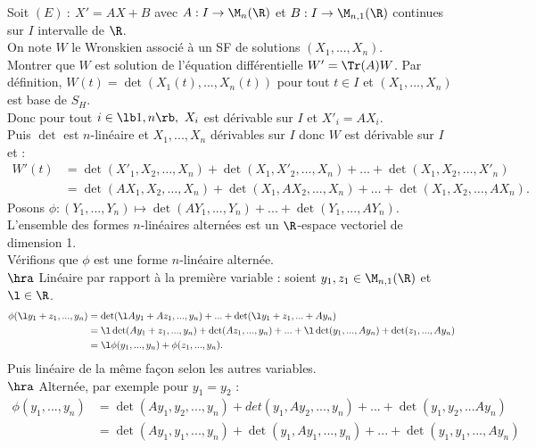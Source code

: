 \documentclass[11pt]{article}
\begin{document}
\begin{exercice}{}{}
    Soit $(E)~:~X'=AX+B$ avec $A:I\to\M_n(\R)$ et $B:I\to\M_{n,1}(\R)$ continues sur $I$ intervalle de $\R$.\\
    On note $W$ le Wronskien associé à un SF de solutions $(X_1,...,X_n)$.\\
    Montrer que $W$ est solution de l'équation différentielle $W'=\Tr(A)W$.
    \tcblower
    Par définition, $W(t)=\det(X_1(t),...,X_n(t))$ pour tout $t\in I$ et $(X_1,...,X_n)$ est base de $S_H$.\\
    Donc pour tout $i\in\lb1,n\rb, ~ X_i$ est dérivable sur $I$ et $X'_i = AX_i$.\\
    Puis $\det$ est $n$-linéaire et $X_1,...,X_n$ dérivables sur $I$ donc $W$ est dérivable sur $I$ et :
    \begin{align*}
        W'(t) &= \det(X'_1, X_2, \dots, X_n) + \det(X_1, X'_2, \dots, X_n) + \dots + \det(X_1,X_2, \dots, X'_n)\\
        &= \det(AX_1, X_2, \dots, X_n) + \det(X_1, AX_2, \dots, X_n) + \dots + \det(X_1,X_2,\dots,AX_n).
    \end{align*} 
    Posons $\phi:(Y_1,...,Y_n) \mapsto \det(AY_1,...,Y_n) + ... + \det(Y_1,...,AY_n)$.\\
    L'ensemble des formes $n$-linéaires alternées est un $\R$-espace vectoriel de dimension 1.\\
    Vérifions que $\phi$ est une forme $n$-linéaire alternée.\\
    $\hra$ Linéaire par rapport à la première variable : soient $y_1,z_1 \in \M_{n,1}(\R)$ et $\l\in\R$.
    \begin{align*}
        \phi(\l y_1 + z_1, ..., y_n) &= \det(\l Ay_1 + Az_1, ..., y_n) + ... + \det(\l y_1 + z_1, ... + Ay_n)\\
        &=\l\det(Ay_1+z_1, ..., y_n) + \det(Az_1, ..., y_n)+ ... + \l\det(y_1,...,Ay_n) + \det(z_1,...,Ay_n) \\
        &= \l \phi(y_1,...,y_n) + \phi(z_1,...,y_n).
    \end{align*}
    Puis linéaire de la même façon selon les autres variables.\\
    $\hra$ Alternée, par exemple pour $y_1=y_2$ :
    \begin{align*}
        \phi(y_1,...,y_n) &= \det(Ay_1, y_2, ..., y_n) + det(y_1,Ay_2,...,y_n) + ... + \det(y_1,y_2,...Ay_n)\\
        &=\det(Ay_1,y_1,...,y_n) + \det(y_1,Ay_1, ..., y_n) + ... + \det(y_1,y_1,...,Ay_n)\\

\end{align*}
\end{exercice}
\end{document}
